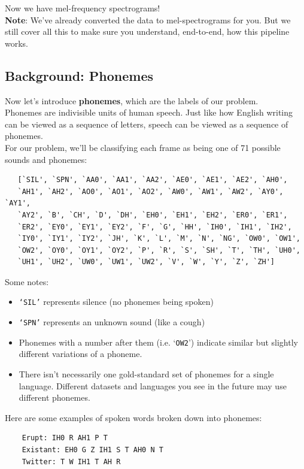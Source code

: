 \documentclass{article}
\newcommand{\ttt}[1]{\texttt{#1}}
\begin{document}
Now we have mel-frequency spectrograms! \\

\textbf{Note}: We've already converted the data to mel-spectrograms for you. But we still cover all this to make sure you understand, end-to-end, how this pipeline works.

\subsection{Background: Phonemes}
Now let's introduce \textbf{phonemes}, which are the labels of our problem. \\

Phonemes are indivisible units of human speech. Just like how English writing can be viewed as a sequence of letters, speech can be viewed as a sequence of phonemes. \\

For our problem, we'll be classifying each frame as being one of 71 possible sounds and phonemes:

\begin{verbatim}
   [`SIL', `SPN', `AA0', `AA1', `AA2', `AE0', `AE1', `AE2', `AH0',
   `AH1', `AH2', `AO0', `AO1', `AO2', `AW0', `AW1', `AW2', `AY0', `AY1',
   `AY2', `B', `CH', `D', `DH', `EH0', `EH1', `EH2', `ER0', `ER1', 
   `ER2', `EY0', `EY1', `EY2', `F', `G', `HH', `IH0', `IH1', `IH2',
   `IY0', `IY1', `IY2', `JH', `K', `L', `M', `N', `NG', `OW0', `OW1',
   `OW2', `OY0', `OY1', `OY2', `P', `R', `S', `SH', `T', `TH', `UH0',
   `UH1', `UH2', `UW0', `UW1', `UW2', `V', `W', `Y', `Z', `ZH']
\end{verbatim}

Some notes:
\begin{itemize}
    \item \ttt{`SIL'} represents silence (no phonemes being spoken)
    \item \ttt{`SPN'} represents an unknown sound (like a cough)
    \item Phonemes with a number after them (i.e. `\ttt{OW2}') indicate similar but slightly different variations of a phoneme.
    \item There isn't necessarily one gold-standard set of phonemes for a single language. Different datasets and languages you see in the future may use different phonemes.
\end{itemize}

Here are some examples of spoken words broken down into phonemes:

\begin{verbatim}
    Erupt: IH0 R AH1 P T
    Existant: EH0 G Z IH1 S T AH0 N T
    Twitter: T W IH1 T AH R
\end{verbatim}
\end{document}

